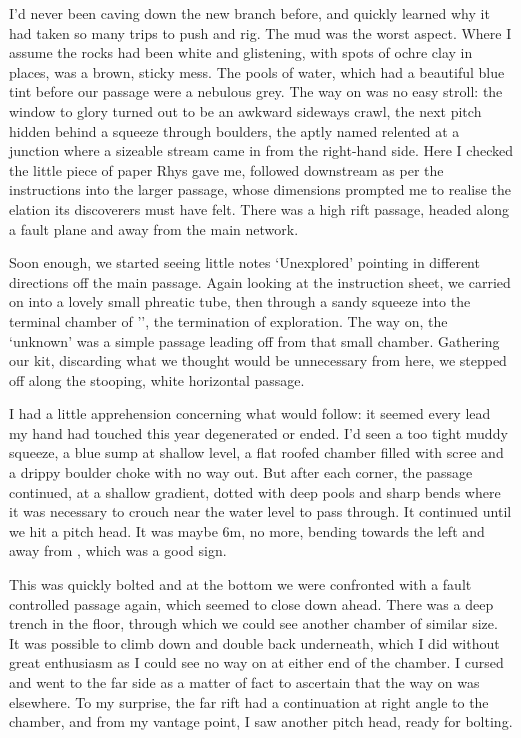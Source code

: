 I’d never been caving  down the new branch before, and quickly learned why it had taken so many trips to push and rig. The mud was the worst aspect. Where I assume the rocks had been white and glistening, with spots of ochre clay in places, was a brown, sticky mess. The pools of water, which had a beautiful blue tint before our passage were a nebulous grey.  The way on was no easy stroll: the window to glory turned out to be an awkward sideways crawl,  the next pitch hidden behind a squeeze through boulders, the aptly named  relented at a junction where a sizeable stream came in from the right-hand side. Here I checked the little piece of paper Rhys gave me, followed downstream as per the instructions into the larger  passage, whose dimensions prompted me to realise the elation its discoverers must have felt. There was a high rift passage, headed along a fault plane and away from the main  network.

Soon enough, we started seeing little notes ‘Unexplored’ pointing in different directions off the main passage.  Again looking at the instruction sheet, we carried on into a lovely small phreatic tube, then through a sandy squeeze into the terminal chamber of '', the termination of exploration. The way on, the ‘unknown’ was a simple passage leading off from that small chamber. Gathering our kit, discarding what we thought would be unnecessary from here, we stepped off along the stooping, white horizontal passage. 

I had a little apprehension concerning what would follow: it seemed every lead my hand had touched this year degenerated or ended. I’d seen a too tight muddy squeeze, a blue sump at shallow level, a flat roofed chamber filled with scree and a drippy boulder choke with no way out. But after each corner, the passage continued, at a shallow gradient, dotted with deep pools and sharp bends where it was necessary to crouch near the water level to pass through. It continued until we hit a pitch head. It was maybe 6m, no more, bending towards the left and away from , which was a good sign. 

This was quickly bolted and at the bottom we were confronted with a fault controlled passage again, which seemed to close down ahead. There was a deep trench in the floor, through which we could see another chamber of similar size. It was possible to climb down and double back underneath, which I did without great enthusiasm as I could see no way on at either end of the chamber. I cursed and went to the far side as a matter of fact to ascertain that the way on was elsewhere. To my surprise, the far rift had a continuation at right angle to the chamber, and from my vantage point, I saw another pitch head, ready for bolting. 

